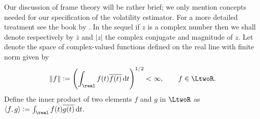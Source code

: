 \documentclass[a4paper, 12pt]{article}
\renewcommand{\D}{\ensuremath{\dif}\xspace}
\begin{document}

Our discussion of  frame theory will be  rather brief; we only mention concepts needed for our specification of the volatility estimator.  For a  more detailed treatment see the book by \cite{Christensen2008}. 
In the sequel if $z$ is a complex number then we shall denote respectively by $\bar{z}$ and $\vert z \vert$ the complex conjugate and magnitude of $z$. Let \LtwoR denote the space of complex-valued functions defined on the real line with finite norm given by 
\begin{align}
  \Vert f \Vert := \left(\int_\real f(t) \overline{f(t)} \D t\right)^{1/2} < \infty, \qquad  f \in \LtwoR.\notag
  \label{}
\end{align}
 Define the  inner product of two elements $f$ and $g$ in $\LtwoR$ as $\langle f,g\rangle :=  \int_\real f(t) \overline{g(t)} \D t$.
\end{document}
